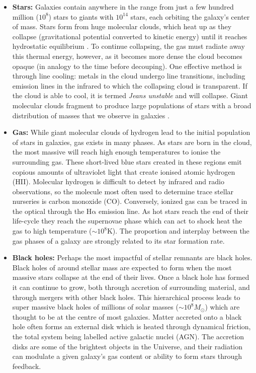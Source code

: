 \begin{itemize}
    \item \textbf{Stars:} Galaxies contain anywhere in the range from just a few hundred million ($10^8$) stars to giants with $10^{14}$ stars, each orbiting the galaxy's center of mass. Stars form from huge molecular clouds, which heat up as they collapse (gravitational potential converted to kinetic energy) until it reaches hydrostatic equilibrium \citep{jeans1902}. To continue collapsing, the gas must radiate away this thermal energy, however, as it becomes more dense the cloud becomes opaque (in analogy to the time before decouping). One effective method is through line cooling: metals in the cloud undergo line transitions, including emission lines in the infrared to which the collapsing cloud is transparent. If the cloud is able to cool, it is termed \textit{Jeans unstable} and will collapse. Giant molecular clouds fragment to produce large populations of stars with a broad distribution of masses that we observe in galaxies \citep[e.g.][]{kroupa2001}.
    
    \item \textbf{Gas:} While giant molecular clouds of hydrogen lead to the initial population of stars in galaxies, gas exists in many phases. As stars are born in the cloud, the most massive will reach high enough temperatures to ionise the surrounding gas. These short-lived blue stars created in these regions emit copious amounts of ultraviolet light that create ionised atomic hydrogen (HII). Molecular hydrogen is difficult to detect by infrared and radio observations, so the molecule most often used to determine trace stellar nurseries is carbon monoxide (CO). Conversely, ionized gas can be traced in the optical through the $\mathrm{H\alpha}$ emission line. As hot stars reach the end of their life-cycle they reach the supernovae phase which can act to shock heat the gas to high temperature ($\sim 10^{8}$K). The proportion and interplay between the gas phases of a galaxy are strongly related to its star formation rate.
    
    \item \textbf{Black holes:} Perhaps the most impactful of stellar remnants are black holes. Black holes of around stellar mass are expected to form when the most massive stars collapse at the end of their lives. Once a black hole has formed it can continue to grow, both through accretion of surrounding material, and through mergers with other black holes. This hierarchical process leads to super massive black holes of millions of solar masses ($\sim 10^8 M_{\odot}$) which are thought to be at the centre of most galaxies. Matter accreted onto a black hole often forms an external disk which is heated through dynamical friction, the total system being labelled active galactic nuclei (AGN). The accretion disks are some of the brightest objects in the Universe, and their radiation can modulate a given galaxy's gas content or ability to form stars through feedback.
    

\end{itemize}
